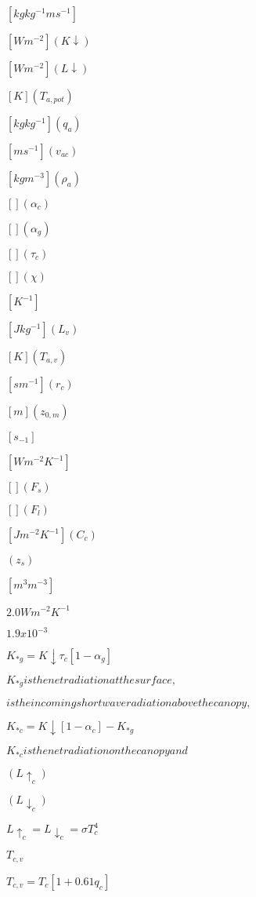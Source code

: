 \documentclass{article}
\begin{document}
{$[kg kg^{-1} m s^{-1} ]$
\pagebreak

$[W m^{-2} ] (K \downarrow )$
\pagebreak

$[W m^{-2} ] (L \downarrow )$
\pagebreak

$[K] (T_{a,pot} )$
\pagebreak

$[kg kg^{-1} ] (q_a )$
\pagebreak

$[m s^{-1} ] (v_{ac} )$
\pagebreak

$[kg m^{-3} ] ( \rho_a )$
\pagebreak

$[ ] ( \alpha_c )$
\pagebreak

$[ ] ( \alpha_g )$
\pagebreak

$[ ] ( \tau_c )$
\pagebreak

$[ ] ( \chi )$
\pagebreak

$[K^{-1} ]$
\pagebreak

$[J kg^{-1} ] (L_v )$
\pagebreak

$[K] (T_{a,v} )$
\pagebreak

$[s m^{-1}] (r_c )$
\pagebreak

$[m] (z_{0,m} )$
\pagebreak

$[s_{-1} ]$
\pagebreak

$[W m^{-2} K^{-1} ]$
\pagebreak

$[ ] (F_s )$
\pagebreak

$[ ] (F_l )$
\pagebreak

$[J m^{-2} K^{-1} ] (C_c )$
\pagebreak

$(z_s)$
\pagebreak

$[m^{3} m^{-3} ]$
\pagebreak

$2.0 W m^{-2} K^{-1}$
\pagebreak

$1.9 x 10^{-3}$
\pagebreak

$K_{*g} = K \downarrow \tau_c [1 - \alpha_g ]$
\pagebreak

$K_{*g} is the net radiation at the surface, $
\pagebreak

$ is the incoming shortwave radiation above the canopy, $
\pagebreak

$K_{*c} = K \downarrow [1 - \alpha_c ] - K_{*g}$
\pagebreak

$K_{*c} is the net radiation on the canopy and $
\pagebreak

$(L \uparrow_c )$
\pagebreak

$(L \downarrow_c )$
\pagebreak

$L \uparrow_c = L \downarrow_c = \sigma T_c^4$
\pagebreak

$T_{c,v}$
\pagebreak

$T_{c,v} = T_c [1 + 0.61 q_c ]$
\pagebreak

}
\end{document}
